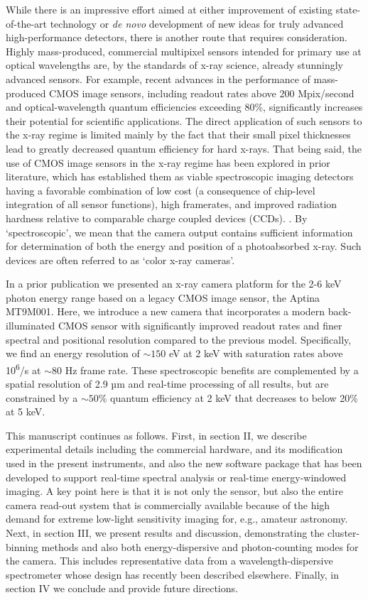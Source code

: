 While there is an impressive effort aimed at either improvement of
existing state-of-the-art technology or \emph{de novo} development of
new ideas for truly advanced high-performance detectors, there is
another route that requires consideration. Highly mass-produced,
commercial multipixel sensors intended for primary use at optical
wavelengths are, by the standards of x-ray science, already stunningly
advanced sensors. For example, recent advances in the performance of
mass-produced CMOS image sensors, including readout rates above 200
Mpix/second and optical-wavelength quantum efficiencies exceeding 80\%,
significantly increases their potential for scientific applications. The
direct application of such sensors to the x-ray regime is limited mainly
by the fact that their small pixel thicknesses lead to greatly decreased
quantum efficiency for hard x-rays. That being said, the use of CMOS
image sensors in the x-ray regime has been explored in prior literature,
which has established them as viable spectroscopic imaging detectors
having a favorable combination of low cost (a consequence of chip-level
integration of all sensor functions), high framerates, and improved
radiation hardness relative to comparable charge coupled devices (CCDs).
\cite{servoli2010characterization, lane2012x, nachtrab2009simple, hoidn2015note}. By `spectroscopic', we mean that the camera
output contains sufficient information for determination of both the
energy and position of a photoabsorbed x-ray. Such devices are often
referred to as `color x-ray cameras'.

In a prior publication we presented an x-ray camera platform for the 2-6
keV photon energy range based on a legacy CMOS image sensor, the Aptina
MT9M001. Here, we introduce a new camera that incorporates a modern
back-illuminated CMOS sensor with significantly improved readout rates
and finer spectral and positional resolution compared to the previous
model. Specifically, we find an energy resolution of
$\sim150$ eV at 2 keV with saturation rates above
10\textsuperscript{6}/s at $\sim80$ Hz frame rate. These
spectroscopic benefits are complemented by a spatial resolution of 2.9
µm and real-time processing of all results, but are constrained by a
$\sim50$\% quantum efficiency at 2 keV that decreases to
below 20\% at 5 keV.

This manuscript continues as follows. First, in section II, we describe
experimental details including the commercial hardware, and its
modification used in the present instruments, and also the new software
package that has been developed to support real-time spectral analysis
or real-time energy-windowed imaging. A key point here is that it is not
only the sensor, but also the entire camera read-out system that is
commercially available because of the high demand for extreme low-light
sensitivity imaging for, e.g., amateur astronomy. Next, in section III,
we present results and discussion, demonstrating the cluster-binning
methods and also both energy-dispersive and photon-counting modes for
the camera. This includes representative data from a
wavelength-dispersive spectrometer whose design has recently been
described elsewhere. \cite{holden2017compact} Finally, in section IV we
conclude and provide future directions.

